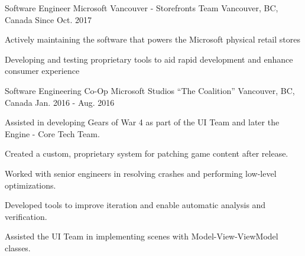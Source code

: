 

\begin{cventries}

  \cventry
    {Software Engineer} %
    {Microsoft Vancouver - Storefronts Team} %
    {Vancouver, BC, Canada} %
    {Since Oct. 2017} %
    {
      \begin{cvitems} %
	\item {Actively maintaining the software that powers the Microsoft physical retail stores}
        \item {Developing and testing proprietary tools to aid rapid development and enhance consumer experience}
        \\
      \end{cvitems}
    }

  \cventry
    {Software Engineering Co-Op} %
    {Microsoft Studios ``The Coalition''} %
    {Vancouver, BC, Canada} %
    {Jan. 2016 - Aug. 2016} %
    {
      \begin{cvitems} %
        \item {Assisted in developing Gears of War 4 as part of the UI Team and later the Engine - Core Tech Team.}
        \item {Created a custom, proprietary system for patching game content after release.}
        \item {Worked with senior engineers in resolving crashes and performing low-level optimizations.}
        \item {Developed tools to improve iteration and enable automatic analysis and verification.}
        \item {Assisted the UI Team in implementing scenes with Model-View-ViewModel classes.}
        \\
      \end{cvitems}
    }


\end{cventries}
